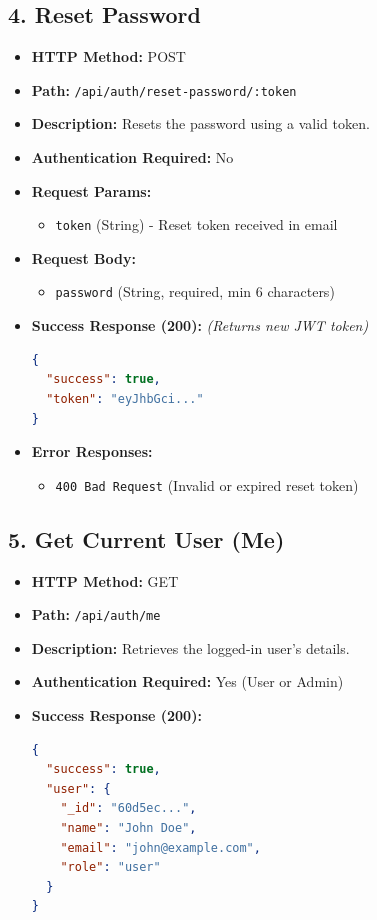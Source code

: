 \documentclass[12pt,a4paper]{article}
\begin{document}
\subsection{4. Reset Password}
\begin{itemize}
    \item \textbf{HTTP Method:} POST
    \item \textbf{Path:} \texttt{/api/auth/reset-password/:token}
    \item \textbf{Description:} Resets the password using a valid token.
    \item \textbf{Authentication Required:} No
    \item \textbf{Request Params:}
    \begin{itemize}
        \item \texttt{token} (String) - Reset token received in email
    \end{itemize}
    \item \textbf{Request Body:}
    \begin{itemize}
        \item \texttt{password} (String, required, min 6 characters)
    \end{itemize}
    \item \textbf{Success Response (200):} \textit{(Returns new JWT token)}
\begin{lstlisting}[language=json]
{
  "success": true,
  "token": "eyJhbGci..."
}
\end{lstlisting}
    \item \textbf{Error Responses:}
    \begin{itemize}
        \item \texttt{400 Bad Request} (Invalid or expired reset token)
    \end{itemize}
\end{itemize}

\subsection{5. Get Current User (Me)}
\begin{itemize}
    \item \textbf{HTTP Method:} GET
    \item \textbf{Path:} \texttt{/api/auth/me}
    \item \textbf{Description:} Retrieves the logged-in user's details.
    \item \textbf{Authentication Required:} Yes (User or Admin)
    \item \textbf{Success Response (200):}
\begin{lstlisting}[language=json]
{
  "success": true,
  "user": {
    "_id": "60d5ec...",
    "name": "John Doe",
    "email": "john@example.com",
    "role": "user"
  }
}
\end{lstlisting}
\end{itemize}
\end{document}
